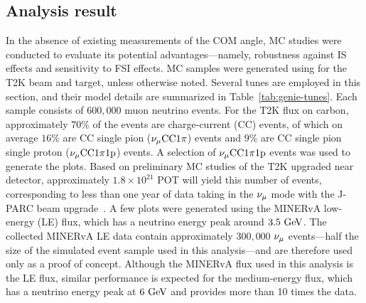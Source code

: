      \subsection{Analysis result}
     \label{sec:com-ana}
     In the absence of existing measurements of the COM angle, MC studies were conducted to evaluate its potential advantages—namely, robustness against IS effects and sensitivity to FSI effects.
     MC samples were generated using \genie \cite{Andreopoulos:2009rq, GENIE:2021npt} for the T2K beam and target, unless otherwise noted. 
     Several \genie tunes are employed in this section, and their model details are summarized in Table~\ref{tab:genie-tunes}.
     Each sample consists of $600,000$ muon neutrino events. 
     For the T2K flux on carbon, approximately $70\%$ of the events are charge‐current (CC) events, of which on average $16\%$ are CC single pion ($\nu_{\mu}\textrm{CC}1\pi$) events and $9\%$ are CC single pion single proton ($\nu_{\mu}\textrm{CC}1\pi1\textrm{p}$) events.
     A selection of $\nu_{\mu}\textrm{CC}1\pi1\textrm{p}$ events was used to generate the plots.
     Based on preliminary MC studies of the T2K upgraded near detector, approximately $1.8\times10^{21}$ POT will yield this number of events, corresponding to less than one year of data taking in the $\nu_{\mu}$ mode with the J-PARC beam upgrade~\cite{T2K:2019eao}.
     A few plots were generated using the MINERvA low-energy (LE) flux, which has a neutrino energy peak around $3.5~\textrm{GeV}$.
     The collected MINERvA LE data contain approximately $300,000$ $\nu_{\mu}$ events—half the size of the simulated event sample used in this analysis—and are therefore used only as a proof of concept.
     Although the MINERvA flux used in this analysis is the LE flux, similar performance is expected for the medium-energy flux, which has a neutrino energy peak at $6~\textrm{GeV}$ and provides more than 10 times the data.
